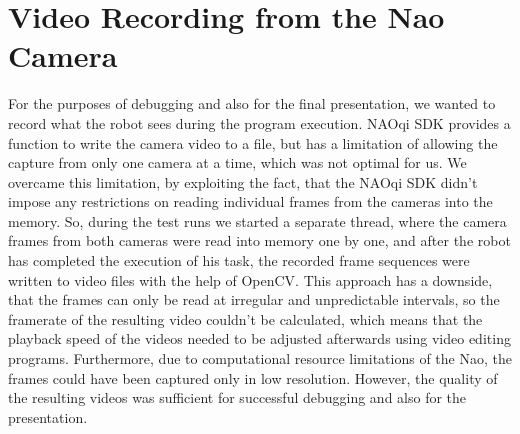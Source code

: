\section{Video Recording from the Nao Camera}

For the purposes of debugging and also for the final presentation, we wanted to
record what the robot sees during the program execution. NAOqi SDK provides a
function to write the camera video to a file, but has a limitation of allowing
the capture from only one camera at a time, which was not optimal for us. We
overcame this limitation, by exploiting the fact, that the NAOqi SDK didn't
impose any restrictions on reading individual frames from the cameras into the
memory. So, during the test runs we started a separate thread, where the camera
frames from both cameras were read into memory one by one, and after the robot
has completed the execution of his task, the recorded frame sequences were
written to video files with the help of OpenCV. This approach has a downside,
that the frames can only be read at irregular and unpredictable intervals, so
the framerate of the resulting video couldn't be calculated, which means that
the playback speed of the videos needed to be adjusted afterwards using video
editing programs. Furthermore, due to computational resource limitations of the
Nao, the frames could have been captured only in low resolution. However, the
quality of the resulting videos was sufficient for successful debugging and
also for the presentation.
